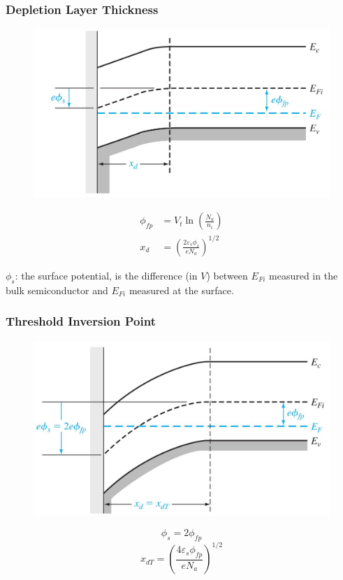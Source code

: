 \documentclass{beamer}
\begin{document}
    \begin{frame} \frametitle{Depletion Layer Thickness}
        \begin{figure}[H]
            \centering
            \includegraphics[width=0.6\linewidth]{Energy-band-diagram-PMOS-and-surface-potential.jpg}
            \label{fig:Energy-band-diagram-PMOS-and-surface-potential.jpg}
        \end{figure}
        \begin{equation*}
            \begin{aligned}
                \phi_{fp} &= V_t \ln \left( \frac{N_a}{n_i}  \right) \\
                x_d &= \left( \frac{2 \varepsilon_s \phi_s}{e N_a}  \right)^{1/2} 
            \end{aligned}
        \end{equation*}
        \par $\phi_s$: the surface potential, is the difference (in $V$) between $E_{Fi}$ measured in the bulk semiconductor and $E_{Fi} $ measured at the surface.
    \end{frame}

    \begin{frame} \frametitle{Threshold Inversion Point}
        \begin{figure}[H]
            \centering
            \includegraphics[width=0.6\linewidth]{Threshold-inversion-point.jpg}
            \label{fig:Threshold-inversion-point.jpg}
        \end{figure}
        \begin{equation*}
            \phi_s = 2 \phi_{fp} 
        \end{equation*}
        \begin{equation*}
            \boxed{x_{dT} = \left( \frac{4\varepsilon_s \phi_{fp} }{e N_a} \right)^{1/2}  }
        \end{equation*}
    \end{frame}
\end{document}
